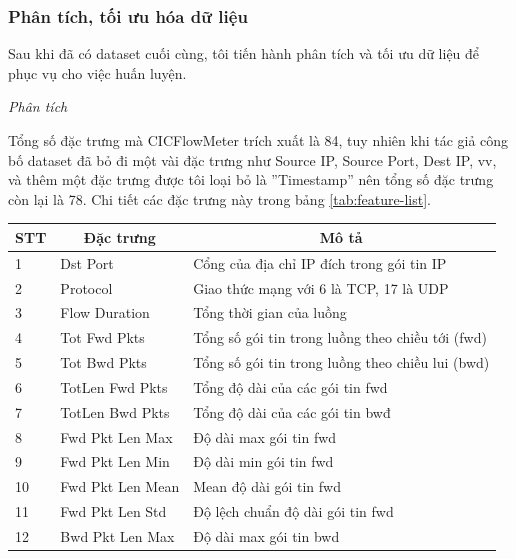 \subsubsection{Phân tích, tối ưu hóa dữ liệu}

Sau khi đã có dataset cuối cùng, tôi tiến hành phân tích và tối ưu dữ liệu để phục vụ cho việc huấn luyện.

\textit{Phân tích}

Tổng số đặc trưng mà CICFlowMeter trích xuất là 84, tuy nhiên khi tác giả công bố dataset đã bỏ đi một vài đặc trưng như Source IP, Source Port, Dest IP, vv, và thêm một đặc trưng được tôi loại bỏ là ''Timestamp'' nên tổng số đặc trưng còn lại là 78. Chi tiết các đặc trưng này trong bảng \ref{tab:feature-list}.

\begin{center}
	\centering
	\begin{longtable}{|l|l|l|}
		\hline
		\multicolumn{1}{|c|}{\textbf{STT}} & \multicolumn{1}{c|}{\textbf{Đặc trưng}} & \multicolumn{1}{c|}{\textbf{Mô tả}} \\ \hline
		1  & Dst Port          & Cổng   của địa chỉ IP đích trong gói tin IP        \\ \hline
		2  & Protocol          & Giao   thức mạng với 6 là TCP, 17 là UDP           \\ \hline
		3  & Flow Duration     & Tổng   thời gian của luồng                         \\ \hline
		4  & Tot Fwd Pkts      & Tổng   số gói tin trong luồng theo chiều tới (fwd) \\ \hline
		5  & Tot Bwd Pkts      & Tổng   số gói tin trong luồng theo chiều lui (bwd) \\ \hline
		6  & TotLen Fwd Pkts   & Tổng   độ dài của các gói tin fwd                  \\ \hline
		7  & TotLen Bwd Pkts   & Tổng   độ dài của các gói tin bwđ                  \\ \hline
		8  & Fwd Pkt Len Max   & Độ   dài max gói tin fwd                           \\ \hline
		9  & Fwd Pkt Len Min   & Độ   dài min gói tin fwd                           \\ \hline
		10 & Fwd Pkt Len Mean  & Mean   độ dài gói tin fwd                          \\ \hline
		11 & Fwd Pkt Len Std   & Độ   lệch chuẩn độ dài gói tin fwd                 \\ \hline
		12 & Bwd Pkt Len Max   & Độ   dài max gói tin bwd                           \\ \hline

\end{longtable}
\end{center}
